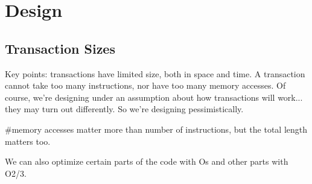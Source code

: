 \section{Design}


\subsection{Transaction Sizes}

Key points: transactions have limited size, both in space and time. A
transaction cannot take too many instructions, nor have too many memory
accesses. Of course, we're designing under an assumption about how transactions
will work... they may turn out differently. So we're designing pessimistically.

#memory accesses matter more than number of instructions, but the total length
matters too.

We can also optimize certain parts of the code with Os and other parts with
O2/3.
